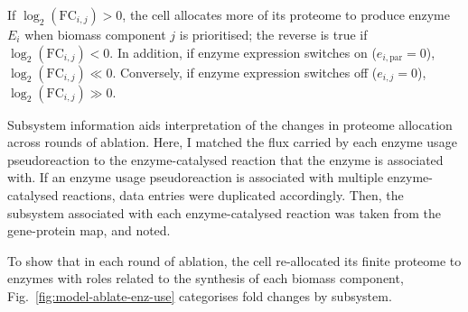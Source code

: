 


If $\log_{2}(\mathrm{FC}_{i,j}) > 0$, the cell allocates more of its proteome to produce enzyme $E_{i}$ when biomass component $j$ is prioritised; the reverse is true if $\log_{2}(\mathrm{FC}_{i,j}) < 0$.
In addition, if enzyme expression switches on ($e_{i, \mathrm{par}} = 0$), $\log_{2}(\mathrm{FC}_{i,j}) \ll 0$.
Conversely, if enzyme expression switches off ($e_{i, j} = 0$), $\log_{2}(\mathrm{FC}_{i,j}) \gg 0$.

Subsystem information aids interpretation of the changes in proteome allocation across rounds of ablation.
Here, I matched the flux carried by each enzyme usage pseudoreaction to the enzyme-catalysed reaction that the enzyme is associated with.
If an enzyme usage pseudoreaction is associated with multiple enzyme-catalysed reactions, data entries were duplicated accordingly.
Then, the subsystem associated with each enzyme-catalysed reaction was taken from the gene-protein map, and noted.

To show that in each round of ablation, the cell re-allocated its finite proteome to enzymes with roles related to the synthesis of each biomass component, Fig.\ \ref{fig:model-ablate-enz-use} categorises fold changes by subsystem.

